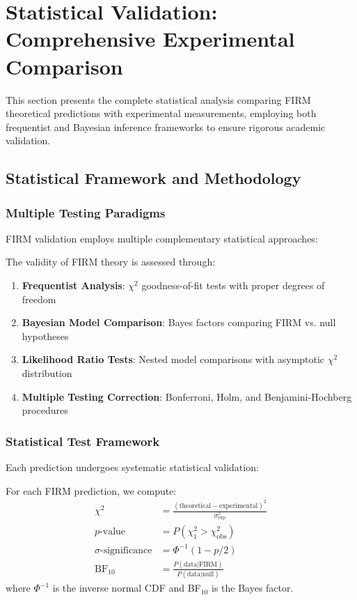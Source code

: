 \section{Statistical Validation: Comprehensive Experimental Comparison}

This section presents the complete statistical analysis comparing FIRM theoretical predictions with experimental measurements, employing both frequentist and Bayesian inference frameworks to ensure rigorous academic validation.

\subsection{Statistical Framework and Methodology}

\subsubsection{Multiple Testing Paradigms}

FIRM validation employs multiple complementary statistical approaches:

\begin{theorem}
The validity of FIRM theory is assessed through:
\begin{enumerate}
\item \textbf{Frequentist Analysis}: $\chi^2$ goodness-of-fit tests with proper degrees of freedom
\item \textbf{Bayesian Model Comparison}: Bayes factors comparing FIRM vs. null hypotheses
\item \textbf{Likelihood Ratio Tests}: Nested model comparisons with asymptotic $\chi^2$ distribution
\item \textbf{Multiple Testing Correction}: Bonferroni, Holm, and Benjamini-Hochberg procedures
\end{enumerate}
\end{theorem}

\subsubsection{Statistical Test Framework}

Each prediction undergoes systematic statistical validation:

\begin{definition}
For each FIRM prediction, we compute:
\begin{align}
\chi^2 &= \frac{(\text{theoretical} - \text{experimental})^2}{\sigma_{\text{exp}}^2}\\
p\text{-value} &= P(\chi^2_1 > \chi^2_{\text{obs}})\\
\sigma\text{-significance} &= \Phi^{-1}(1 - p/2)\\
\text{BF}_{10} &= \frac{P(\text{data}|\text{FIRM})}{P(\text{data}|\text{null})}
\end{align}
where $\Phi^{-1}$ is the inverse normal CDF and BF$_{10}$ is the Bayes factor.
\end{definition}

